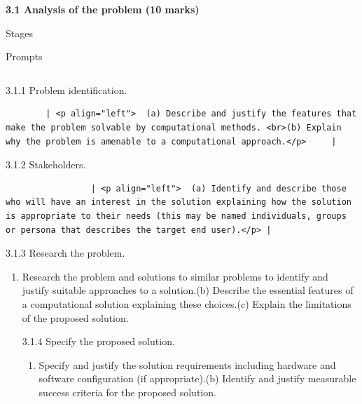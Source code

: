 \documentclass[11pt]{article}
\providecommand{\tightlist}{%
      \setlength{\itemsep}{0pt}\setlength{\parskip}{0pt}}
\begin{document}
\textbf{3.1 Analysis of the problem (10 marks)}

\textbar{}

Stages

\textbar{}

Prompts

\begin{longtable}[]{@{}lc@{}}
\toprule
\bottomrule
\end{longtable}

\textbar{}

3.1.1 Problem identification.

\begin{verbatim}
        | <p align="left">  (a) Describe and justify the features that make the problem solvable by computational methods. <br>(b) Explain why the problem is amenable to a computational approach.</p>     |
\end{verbatim}

\textbar{}

3.1.2 Stakeholders.

\begin{verbatim}
                 | <p align="left">  (a) Identify and describe those who will have an interest in the solution explaining how the solution is appropriate to their needs (this may be named individuals, groups or persona that describes the target end user).</p> |
\end{verbatim}

\textbar{}

3.1.3 Research the problem.

\textbar{}

\begin{enumerate}
\def\labelenumi{(\alph{enumi})}
\tightlist
\item
  Research the problem and solutions to similar problems to identify and
  justify suitable approaches to a solution.(b) Describe the essential
  features of a computational solution explaining these choices.(c)
  Explain the limitations of the proposed solution.

  \textbar{} \textbar{}

  3.1.4 Specify the proposed solution.

  \textbar{}

  \begin{enumerate}
  \def\labelenumii{(\alph{enumii})}
  \tightlist
  \item
    Specify and justify the solution requirements including hardware and
    software configuration (if appropriate).(b) Identify and justify
    measurable success criteria for the proposed solution.
  \end{enumerate}
\end{enumerate}
\end{document}
